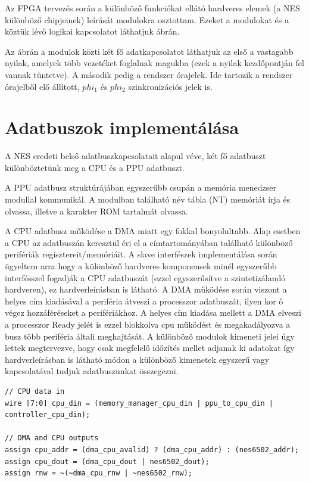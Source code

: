 Az FPGA tervezés során a különböző funkciókat ellátó hardveres elemek (a NES különböző chipjeinek) leírását modulokra osztottam. Ezeket a modulokat és a köztük lévő logikai kapcsolatot láthatjuk  ábrán.

Az ábrán a modulok közti két fő adatkapcsolatot láthatjuk az első a vastagabb nyilak, amelyek több vezetéket foglalnak magukba (ezek a nyilak kezdőpontján fel vannak tüntetve). A második pedig a rendszer órajelek. Ide tartozik a rendszer órajelből elő állított, $phi_1$ és $phi_2$ szinkronizációs jelek is.



\section{Adatbuszok implementálása}

A NES eredeti belső adatbuszkapcsolatait alapul véve, két fő adatbuszt különböztetünk meg a CPU és a PPU adatbuszt. 

A PPU adatbusz struktúrájában egyszerűbb csupán a memória menedzser modullal kommunikál. A modulban található név tábla (NT) memóriát írja és olvassa, illetve a karakter ROM tartalmát olvassa. 

A CPU adatbusz működése a DMA miatt egy fokkal bonyolultabb. Alap esetben a CPU az adatbuszán keresztül éri el a címtartományában található különböző perifériák regisztereit/memóriáit. A slave interfészek implementálása során ügyeltem arra hogy a különböző hardveres komponensek minél egyszerűbb interfésszel fogadják a CPU adatbuszát (ezzel egyszerűsítve a szintetizálandó hardveren), ez  hardverleírásban is látható. A DMA működése során viszont a helyes cím kiadásával a periféria átveszi a processzor adatbuszát, ilyen kor ő végez hozzáféréseket a perifériákhoz. A helyes cím kiadása mellett a DMA elveszi a processzor Ready jelét is ezzel blokkolva cpu működést és megakadályozva a busz több periféria általi meghajtását. A különböző modulok kimeneti jelei úgy lettek megtervezve, hogy csak megfelelő időzítés mellet adjanak ki adatokat így  hardverleírásban is látható módon a különböző kimenetek egyszerű vagy kapcsolatával tudjuk adatbuszunkat összegezni.

\begin{lstlisting}[caption={CPU adatbuszt befolyásoló DMA jelek}, label={code:cpu-data-bus}, style=prettyverilog]
// CPU data in
wire [7:0] cpu_din = (memory_manager_cpu_din | ppu_to_cpu_din | controller_cpu_din);

// DMA and CPU outputs
assign cpu_addr = (dma_cpu_avalid) ? (dma_cpu_addr) : (nes6502_addr);
assign cpu_dout = (dma_cpu_dout | nes6502_dout);
assign rnw = ~(~dma_cpu_rnw | ~nes6502_rnw);\end{lstlisting}


